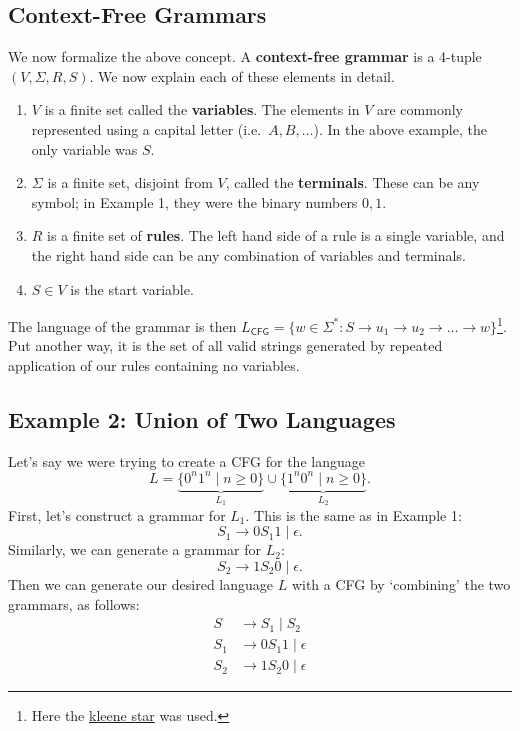 \documentclass{article}
\begin{document}
\subsection*{Context-Free Grammars}
    We now formalize the above concept. A \textbf{context-free grammar} is a 4-tuple $(V, \Sigma, R, S)$. We now explain each of these elements in detail.
    \begin{enumerate}[label = \arabic*.]
        \item $V$ is a finite set called the \textbf{variables}. The elements in $V$ are commonly represented using a capital letter (i.e.\ $A, B, \dots$). In the above example, the only variable was $S$.
        \item $\Sigma$ is a finite set, disjoint from $V$, called the \textbf{terminals}. These can be any symbol; in Example 1, they were the binary numbers $0, 1$.
        \item $R$ is a finite set of \textbf{rules}. The left hand side of a rule is a single variable, and the right hand side can be any combination of variables and terminals.
        \item $S \in V$ is the start variable.
    \end{enumerate}
    The language of the grammar is then $L_{\textsf{CFG}} = \{w \in \Sigma^{*} : S \rightarrow u_{1} \rightarrow u_{2} \rightarrow \dots \rightarrow w\}$\footnote{Here the \href{https://en.wikipedia.org/wiki/Kleene_star}{kleene star} was used.}. Put another way, it is the set of all valid strings generated by repeated application of our rules containing no variables.

\subsection*{Example 2: Union of Two Languages}
    Let's say we were trying to create a CFG for the language $$L = \underbrace{\{0^{n}1^{n} \mid n \ge 0\}}_{L_{1}} \cup \underbrace{\{1^{n}0^{n} \mid n \ge 0\}}_{L_{2}}.$$ First, let's construct a grammar for $L_{1}$. This is the same as in Example 1: $$S_{1} \rightarrow 0S_{1}1 \mid \epsilon.$$ Similarly, we can generate a grammar for $L_{2}$: $$S_{2} \rightarrow 1S_{2}0 \mid \epsilon.$$ Then we can generate our desired language $L$ with a CFG by `combining' the two grammars, as follows:
    \begin{align*}
        S &\rightarrow S_{1} \mid S_{2} \\
        S_{1} &\rightarrow 0S_{1}1 \mid \epsilon \\
        S_{2} &\rightarrow 1S_{2}0 \mid \epsilon
    \end{align*}
\end{document}
